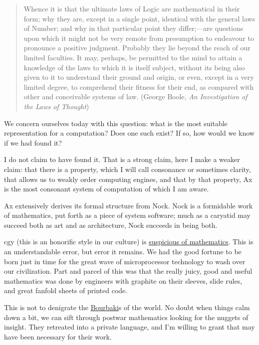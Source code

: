 \documentclass[twoside]{article}
\begin{document}
\begin{quote}
  Whence it is that the ultimate laws of Logic are mathematical in their form; why they are, except in a single point, identical with the general laws of Number; and why in that particular point they differ;---are questions upon which it might not be very remote from presumption to endeavour to pronounce a positive judgment.  Probably they lie beyond the reach of our limited faculties.  It may, perhaps, be permitted to the mind to attain a knowledge of the laws to which it is itself subject, without its being also given to it to understand their ground and origin, or even, except in a very limited degree, to comprehend their fitness for their end, as compared with other and conceivable systems of law.  (George Boole, \emph{An Investigation of the Laws of Thought})
\end{quote}

We concern ourselves today with this question: what is the most suitable representation for a computation? Does one such exist? If so, how would we know if we had found it?

I do not claim to have found it. That is a strong claim, here I make a weaker claim: that there is a property, which I will call consonance or sometimes clarity, that allows us to weakly order computing engines, and that by that property, Ax is the most consonant system of computation of which I am aware.

Ax extensively derives its formal structure from Nock. Nock is a formidable work of mathematics, put forth as a piece of system software; much as a caryatid may succeed both as art and as architecture, Nock succeeds in being both.

cgy (this is an honorific style in our culture) is \href{https://unqualifiedreservations.wordpress.com/2007/08/02/whats-wrong-with-cs-research/}{suspicious of mathematics}. This is an understandable error, but error it remains. We had the good fortune to be born just in time for the great wave of microprocessor technology to wash over our civilization. Part and parcel of this was that the really juicy, good and useful mathematics was done by engineers with graphite on their sleeves, slide rules, and great fanfold sheets of printed code.

This is not to denigrate the \href{https://en.wikipedia.org/wiki/Nicolas_Bourbaki}{Bourbaki}s of the world. No doubt when things calm down a bit, we can sift through postwar mathematics looking for the nuggets of insight. They retreated into a private language, and I'm willing to grant that may have been necessary for their work.
\end{document}
